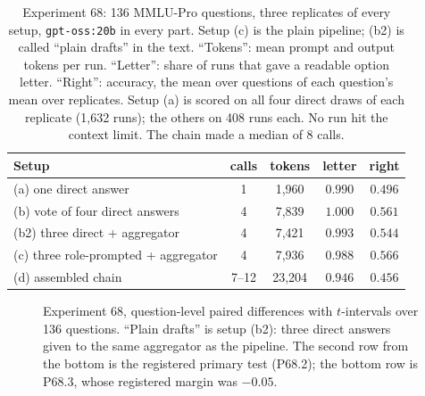 \documentclass[10pt,twocolumn]{article}
\begin{document}
\begin{table}[t]
\centering\footnotesize
\setlength{\tabcolsep}{3pt}
\begin{tabular}{lcccc}
\toprule
Setup & calls & tokens & letter & right \\
\midrule
(a) one direct answer & 1 & 1{,}960 & $0.990$ & $0.496$ \\
(b) vote of four direct answers & 4 & 7{,}839 & $1.000$ & $0.561$ \\
(b2) three direct + aggregator & 4 & 7{,}421 & $0.993$ & $0.544$ \\
(c) three role-prompted + aggregator & 4 & 7{,}936 & $0.988$ & $0.566$ \\
(d) assembled chain & 7--12 & 23{,}204 & $0.946$ & $0.456$ \\
\bottomrule
\end{tabular}
\caption{Experiment 68: 136 MMLU-Pro questions, three replicates of
every setup, \texttt{gpt-oss:20b} in every part. Setup (c) is the plain
pipeline; (b2) is called ``plain drafts'' in the text. ``Tokens'': mean prompt
and output tokens per run. ``Letter'': share of runs that gave a
readable option letter. ``Right'': accuracy, the mean over questions of
each question's mean over replicates. Setup (a) is scored on all four
direct draws of each replicate (1{,}632 runs); the others on 408 runs
each. No run hit the context limit. The chain made a median of 8 calls.}
\label{tab:accuracy}
\end{table}

\begin{figure}[t]
\centering
{}
\caption{Experiment 68, question-level paired differences with
$t$-intervals over 136 questions. ``Plain drafts'' is setup (b2): three
direct answers given to the same aggregator as the pipeline. The
second row from the bottom is the registered primary test (P68.2); the
bottom row is P68.3, whose registered margin was $-0.05$.}
\label{fig:accuracy}
\end{figure}
\end{document}
